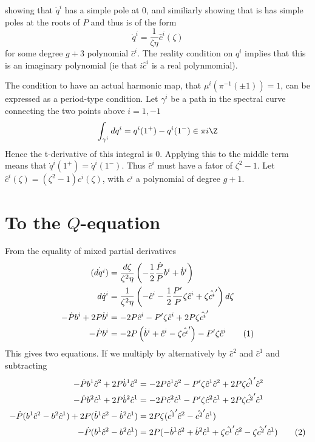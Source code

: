 \documentclass{article}
\newcommand{\labelthis}[1]{\addtocounter{equation}{1}\tag{\theequation}\label{#1}}
\begin{document}
showing that $\dot q^i$ has a simple pole at $0$, and similiarly showing that is has simple poles at the roots of $P$ and thus is of the form
\[
\dot{q}^i = \frac{1}{\zeta\eta}\hat c^i(\zeta)
\]
for some degree $g+3$ polynomial $\hat c^i$. The reality condition on $q^i$ implies that this is an imaginary polynomial (ie that $i \hat c^i$ is a real polynmomial).

The condition to have an actual harmonic map, that $\mu^i(\pi^{-1}(\pm 1)) = 1$, can be expressed as a period-type condition. Let $\gamma^i$ be a path in the spectral curve connecting the two points above $i=1,-1$
\begin{align*}
\int_{\gamma^i} dq^i = q^i(1^+) - q^i(1^-) \in \pi i \Z
\end{align*}
Hence the t-derivative of this integral is 0. Applying this to the middle term means that $\dot q^i(1^+) = \dot q^i(1^-)$. Thus $\hat c^i$ must have a fator of $\zeta^2-1$. Let $\hat c^i(\zeta) = (\zeta^2 - 1) c^i(\zeta)$, with $c^i$ a polynomial of degree $g+1$.









\section{To the $Q$-equation} %
\label{sec:more_stuff}
From the equality of mixed partial derivatives
\begin{align*}
\dot{(dq^i)} &= \frac{d\zeta}{\zeta^2\eta}\left( -\frac{1}{2}\frac{\dot P}{P}b^i + \dot b^i \right) \\
d\dot q^i & = \frac{1}{\zeta^2\eta}\left( -\hat c^i -\frac{1}{2}\frac{P'}{P}\zeta\hat c^i + \zeta\hat {c^i}'\right)d\zeta \\
-\dot P b^i + 2P \dot b^i & = -2P \hat c^i -P'\zeta\hat c^i + 2P\zeta\hat {c^i}' \\
-\dot P b^i &= -2P\left( \dot b^i + \hat c^i - \zeta\hat {c^i}'\right) -P'\zeta\hat c^i \labelthis{eq:EMPDi}
\end{align*}
This gives two equations. If we multiply by alternatively by $\hat c^2$ and $\hat c^1$ and subtracting
\begin{align*}
-\dot P b^1\hat c^2 + 2P \dot b^1\hat c^2 & = -2P \hat c^1\hat c^2 -P'\zeta\hat c^1\hat c^2 + 2P\zeta\hat {c^1}'\hat c^2 \\
-\dot P b^2\hat c^1 + 2P \dot b^2\hat c^1 & = -2P \hat c^2\hat c^1 -P'\zeta\hat c^2\hat c^1 + 2P\zeta\hat {c^2}'\hat c^1 \\
-\dot P (b^1\hat c^2 - b^2\hat c^1) + 2P (\dot b^1\hat c^2 - \dot b^2\hat c^1) & =  2P\zeta(\hat {c^1}'\hat c^2 - \hat {c^2}'\hat c^1) \\
-\dot P (b^1\hat c^2 - b^2\hat c^1) & =  2P(-\dot b^1\hat c^2 + \dot b^2\hat c^1 + \zeta\hat {c^1}'\hat c^2 - \zeta\hat {c^2}'\hat c^1)\labelthis{eq:diffed}
\end{align*}
\end{document}
